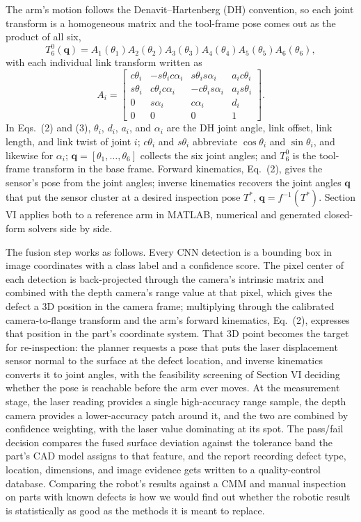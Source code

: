 \documentclass[conference]{IEEEtran}
\begin{document}
The arm's motion follows the Denavit--Hartenberg (DH) convention, so each joint transform is a homogeneous matrix and the tool-frame pose comes out as the product of all six,
\begin{equation}
T_6^0(\mathbf{q}) = A_1(\theta_1)A_2(\theta_2)A_3(\theta_3)A_4(\theta_4)A_5(\theta_5)A_6(\theta_6),
\label{eq:fk}
\end{equation}
with each individual link transform written as
\begin{equation}
A_i = \begin{bmatrix}
c\theta_i & -s\theta_i c\alpha_i & s\theta_i s\alpha_i & a_i c\theta_i \\
s\theta_i & c\theta_i c\alpha_i & -c\theta_i s\alpha_i & a_i s\theta_i \\
0 & s\alpha_i & c\alpha_i & d_i \\
0 & 0 & 0 & 1
\end{bmatrix}.
\label{eq:dh}
\end{equation}
In Eqs.~(2) and (3), $\theta_i$, $d_i$, $a_i$, and $\alpha_i$ are the DH joint angle, link offset, link length, and link twist of joint $i$; $c\theta_i$ and $s\theta_i$ abbreviate $\cos\theta_i$ and $\sin\theta_i$, and likewise for $\alpha_i$; $\mathbf{q}=[\theta_1,\ldots,\theta_6]$ collects the six joint angles; and $T_6^0$ is the tool-frame transform in the base frame. Forward kinematics, Eq.~(2), gives the sensor's pose from the joint angles; inverse kinematics recovers the joint angles $\mathbf{q}$ that put the sensor cluster at a desired inspection pose $T^*$, $\mathbf{q} = f^{-1}(T^*)$. Section VI applies both to a reference arm in MATLAB, numerical and generated closed-form solvers side by side.

The fusion step works as follows. Every CNN detection is a bounding box in image coordinates with a class label and a confidence score. The pixel center of each detection is back-projected through the camera's intrinsic matrix and combined with the depth camera's range value at that pixel, which gives the defect a 3D position in the camera frame; multiplying through the calibrated camera-to-flange transform and the arm's forward kinematics, Eq.~(2), expresses that position in the part's coordinate system. That 3D point becomes the target for re-inspection: the planner requests a pose that puts the laser displacement sensor normal to the surface at the defect location, and inverse kinematics converts it to joint angles, with the feasibility screening of Section VI deciding whether the pose is reachable before the arm ever moves. At the measurement stage, the laser reading provides a single high-accuracy range sample, the depth camera provides a lower-accuracy patch around it, and the two are combined by confidence weighting, with the laser value dominating at its spot. The pass/fail decision compares the fused surface deviation against the tolerance band the part's CAD model assigns to that feature, and the report recording defect type, location, dimensions, and image evidence gets written to a quality-control database. Comparing the robot's results against a CMM and manual inspection on parts with known defects is how we would find out whether the robotic result is statistically as good as the methods it is meant to replace.
\end{document}

